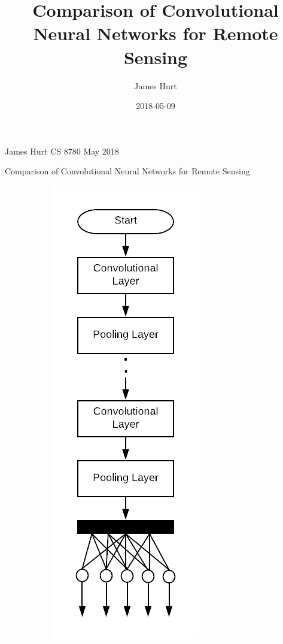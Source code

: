 \documentclass[12pt]{article}
\title{Comparison of Convolutional Neural Networks for Remote Sensing}
\date{2018-05-09}
\author{James Hurt}
\begin{document}
	
	\begin{flushright}
		James Hurt\break
		CS 8780 May 2018
	\end{flushright}
	\begin{center}
		\huge{Comparison of Convolutional Neural Networks for Remote Sensing}
	\end{center}
	

	\begin{figure}[b!]
			\centering
			\begin{subfigure}[b]{0.3\linewidth}
				\centering
				\includegraphics[scale=0.38]{img/custom_arc.png}

\end{subfigure}
\end{figure}
\end{document}
